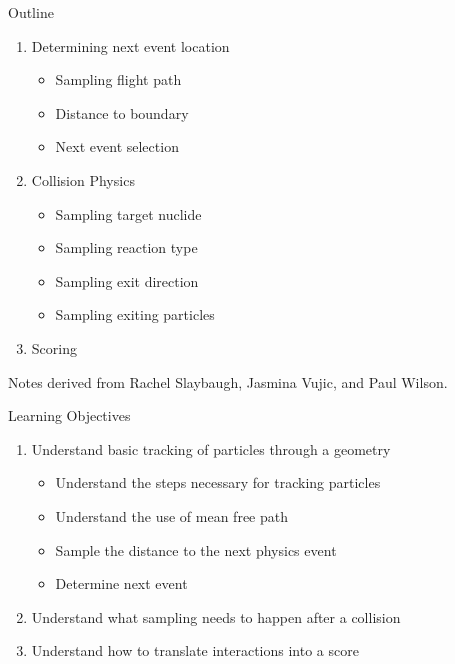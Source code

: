 \documentclass[xcolor=x11names,compress,handout]{beamer}
\renewcommand{\(}{\begin{columns}}
\renewcommand{\)}{\end{columns}}
\newcommand{\<}[1]{\begin{column}{#1}}
\renewcommand{\>}{\end{column}}
\begin{document}
\begin{frame}{Outline}

    \begin{enumerate}
    \item Determining next event location
      \begin{itemize}
      \item Sampling flight path
      \item Distance to boundary %
      \item Next event selection
      \end{itemize}
    \item Collision Physics
      \begin{itemize}
      \item Sampling target nuclide
      \item Sampling reaction type
      \item Sampling exit direction
      \item Sampling exiting particles
      \end{itemize}
    \item Scoring
    \end{enumerate}

\vspace*{1em}
Notes derived from Rachel Slaybaugh, Jasmina Vujic, and Paul Wilson.
\end{frame}



\begin{frame}{Learning Objectives}

    \begin{enumerate}
    \item Understand basic tracking of particles through a geometry
      \begin{itemize}
      \item Understand the steps necessary for tracking particles
      \item Understand the use of mean free path
      \item Sample the distance to the next physics event
      \item Determine next event
      \end{itemize}
    \item Understand what sampling needs to happen after a collision
    \item Understand how to translate interactions into a score
    \end{enumerate}

\end{frame}
\end{document}
